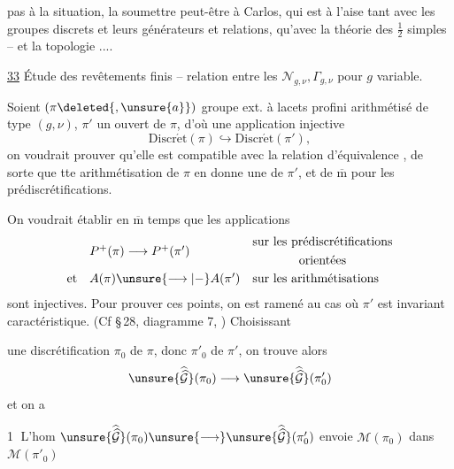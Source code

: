 
pas à la situation, la soumettre peut-être à Carlos, qui est à l'aise tant avec les groupes discrets et leurs générateurs et relations, qu'avec la théorie des $\frac{1}{2}$ simples -- et la topologie ....


\uline{33} Étude des revêtements finis -- relation entre les $\mathcal N_{g,\nu},\Gamma_{g,\nu}$ pour $g$ variable.

Soient $(\pi\deleted{,\unsure{a}})$ groupe ext. à lacets profini arithmétisé de type $(g,\nu)$, $\pi'$ un  ouvert de $\pi$, d'où une application injective
\[
\mathrm{Discr\acute{e}t}(\pi)\hookrightarrow
\mathrm{Discr\acute{e}t}(\pi'),
\]
on voudrait prouver qu'elle est compatible avec la relation d'équivalence , de  sorte que tte arithmétisation de $\pi$ en donne une de $\pi'$, et de $\overline{\mathrm m}$ pour les  prédiscrétifications.

On voudrait établir en $\overline{\mathrm m}$ temps que les applications
\[
\begin{array}{lll}
 &P^+(\pi)\longrightarrow P^+(\pi')&\begin{gathered}\text{sur les prédiscrétifications}\\\text{orientées}\end{gathered}\\[1em]
\text{et}&A(\pi)\unsure{\longrightarrow|-}A(\pi')&\text{sur les arithmétisations}
\end{array}
\]
sont injectives. Pour prouver ces points, on est ramené au cas où $\pi'$ est invariant caractéristique. (Cf \S\,28, diagramme 7, ) Choisissant


une discrétification $\pi_0$ de $\pi$, donc $\pi'_0$ de $\pi'$, on trouve alors
\[
\unsure{\widehat{\widehat{\mathcal G}}}(\pi_0)\longrightarrow
\unsure{\widehat{\widehat{\mathcal G}}}(\pi'_0)
\]
et on a

\textcircled{1} L'hom $\unsure{\widehat{\widehat{\mathcal G}}}(\pi_0)\unsure{\longrightarrow}\unsure{\widehat{\widehat{\mathcal G}}}(\pi'_0)$ envoie $\mathcal M(\pi_0)$ dans $\mathcal M(\pi'_0)$

